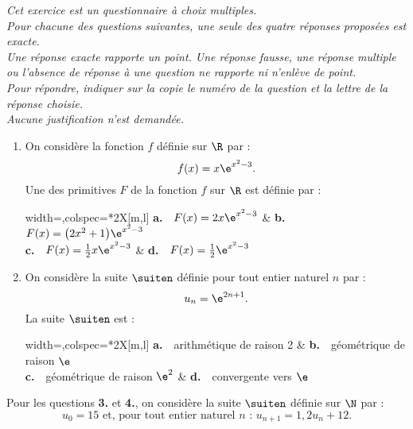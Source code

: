 \emph{Cet exercice est un questionnaire à choix multiples.\\Pour chacune des questions suivantes, une seule des quatre réponses proposées est exacte.\\	Une réponse exacte rapporte un point. Une réponse fausse, une réponse multiple ou l’absence de réponse à une question ne rapporte ni n’enlève de point.\\Pour répondre, indiquer sur la copie le numéro de la question et la lettre de la réponse choisie.\\Aucune justification n’est demandée.}

\bigskip

\begin{enumerate}
	\item On considère la fonction $f$ définie sur $\R$ par : \[ f(x)=x\e^{x^2-3}. \]
	Une des primitives $F$ de la fonction $f$ sur $\R$ est définie par :
	
	\medskip
	
	\begin{tblr}{width=\linewidth,colspec={*{2}{X[m,l]}}}
		\textbf{a.}~~$F(x)=2x\e^{x^2-3}$ & \textbf{b.}~~$F(x)=\big(2x^2+1\big)\e^{x^2-3}$ \\
		\textbf{c.}~~$F(x)=\frac12 x\e^{x^2-3}$ & \textbf{d.}~~$F(x)=\frac12 \e^{x^2-3}$
	\end{tblr}
	\item On considère la suite $\suiten$ définie pour tout entier naturel $n$ par : \[ u_n = \e^{2n+1}. \]
	La suite $\suiten$ est :
	
	\medskip
	
	\begin{tblr}{width=\linewidth,colspec={*{2}{X[m,l]}}}
		\textbf{a.}~~arithmétique de raison 2 & \textbf{b.}~~géométrique de raison $\e$ \\
		\textbf{c.}~~géométrique de raison $\e^2$ & \textbf{d.}~~convergente vers $\e$
	\end{tblr}
\end{enumerate}

Pour les questions \textbf{3.} et \textbf{4.}, on considère la suite $\suiten$ définie sur $\N$ par : \[ u_0=15 \text{ et, pour tout entier naturel }n \text{ : } u_{n+1}=1,2u_n+12. \]

